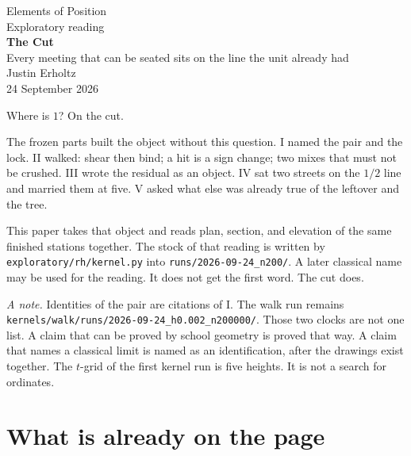 \documentclass[10pt,a4paper]{article}
\theoremstyle{plain}
\theoremstyle{definition}
\theoremstyle{remark}
\begin{document}
\begin{center}
\vspace*{1.6em}
{\large Elements of Position}\\[0.6em]
{\small Exploratory reading}\\[1.2em]
{\LARGE\bfseries The Cut}\\[0.5em]
{\small Every meeting that can be seated sits on the line the unit already had}\\[1.6em]
{\normalsize Justin Erholtz}\\[0.25em]
{\small 24 September 2026}
\end{center}

\vspace{1.0em}

\begin{center}
{\large Where is \(1\)? On the cut.}
\end{center}

\vspace{0.9em}

\noindent
The frozen parts built the object without this question.
I named the pair and the lock.
II walked: shear then bind; a hit is a sign change; two mixes that must not be crushed.
III wrote the residual as an object.
IV sat two streets on the \(1/2\) line and married them at five.
V asked what else was already true of the leftover and the tree.

This paper takes that object and reads plan, section, and elevation of the same finished stations together.
The stock of that reading is written by
\texttt{exploratory/rh/kernel.py}
into
\texttt{runs/2026-09-24\_n200/}.
A later classical name may be used for the reading.
It does not get the first word.
The cut does.

\vspace{0.7em}
\noindent
\textit{A note.}
Identities of the pair are citations of I.
The walk run remains
\texttt{kernels/walk/runs/2026-09-24\_h0.002\_n200000/}.
Those two clocks are not one list.
A claim that can be proved by school geometry is proved that way.
A claim that names a classical limit is named as an identification, after the drawings exist together.
The \(t\)-grid of the first kernel run is five heights.
It is not a search for ordinates.

\tableofcontents

\section{What is already on the page}
\end{document}
